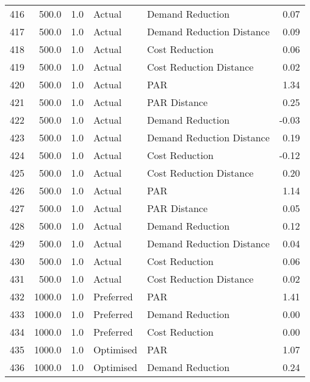 \begin{longtable}{lrrllr}
416  &        500.0 &     1.0 &         Actual &           Demand Reduction &   0.07 \\
417  &        500.0 &     1.0 &         Actual &  Demand Reduction Distance &   0.09 \\
418  &        500.0 &     1.0 &         Actual &             Cost Reduction &   0.06 \\
419  &        500.0 &     1.0 &         Actual &    Cost Reduction Distance &   0.02 \\
420  &        500.0 &     1.0 &         Actual &                        PAR &   1.34 \\
421  &        500.0 &     1.0 &         Actual &               PAR Distance &   0.25 \\
422  &        500.0 &     1.0 &         Actual &           Demand Reduction &  -0.03 \\
423  &        500.0 &     1.0 &         Actual &  Demand Reduction Distance &   0.19 \\
424  &        500.0 &     1.0 &         Actual &             Cost Reduction &  -0.12 \\
425  &        500.0 &     1.0 &         Actual &    Cost Reduction Distance &   0.20 \\
426  &        500.0 &     1.0 &         Actual &                        PAR &   1.14 \\
427  &        500.0 &     1.0 &         Actual &               PAR Distance &   0.05 \\
428  &        500.0 &     1.0 &         Actual &           Demand Reduction &   0.12 \\
429  &        500.0 &     1.0 &         Actual &  Demand Reduction Distance &   0.04 \\
430  &        500.0 &     1.0 &         Actual &             Cost Reduction &   0.06 \\
431  &        500.0 &     1.0 &         Actual &    Cost Reduction Distance &   0.02 \\
432  &       1000.0 &     1.0 &      Preferred &                        PAR &   1.41 \\
433  &       1000.0 &     1.0 &      Preferred &           Demand Reduction &   0.00 \\
434  &       1000.0 &     1.0 &      Preferred &             Cost Reduction &   0.00 \\
435  &       1000.0 &     1.0 &      Optimised &                        PAR &   1.07 \\
436  &       1000.0 &     1.0 &      Optimised &           Demand Reduction &   0.24 \\

\end{longtable}

